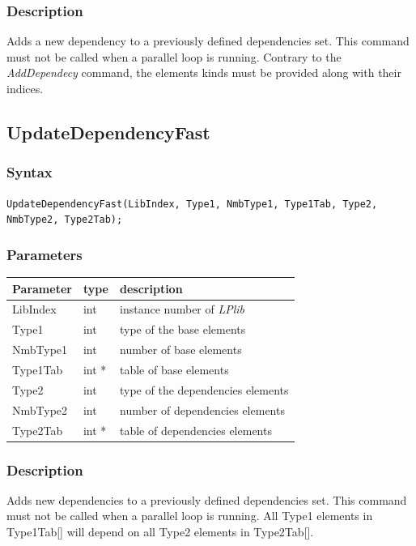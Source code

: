 \documentclass[a4paper,12pt]{article}
\begin{document}
\subsubsection*{Description}
Adds a new dependency to a previously defined dependencies set. This command must not be called when a parallel loop is running. Contrary to the \emph{AddDependecy} command, the elements kinds must be provided along with their indices.


\subsection{UpdateDependencyFast}

\subsubsection*{Syntax}
\tt{UpdateDependencyFast(LibIndex, Type1, NmbType1, Type1Tab, Type2, NmbType2, Type2Tab);}
\normalfont

\subsubsection*{Parameters}
\begin{tabular}{|m{2cm}|m{1.5cm}|m{10.5cm}|}
\hline
Parameter  & type   & description \\
\hline
LibIndex   & int    & instance number of \emph{LPlib} \\
\hline
Type1      & int    & type of the base elements \\
\hline
NmbType1   & int    & number of base elements \\
\hline
Type1Tab   & int *  & table of base elements \\
\hline
Type2      & int    & type of the dependencies elements \\
\hline
NmbType2   & int    & number of dependencies elements \\
\hline
Type2Tab   & int *  & table of dependencies elements \\
\hline
\end{tabular}

\subsubsection*{Description}
Adds new dependencies to a previously defined dependencies set. This command must not be called when a parallel loop is running. All Type1 elements in Type1Tab[] will depend on all Type2 elements in Type2Tab[].
\end{document}
